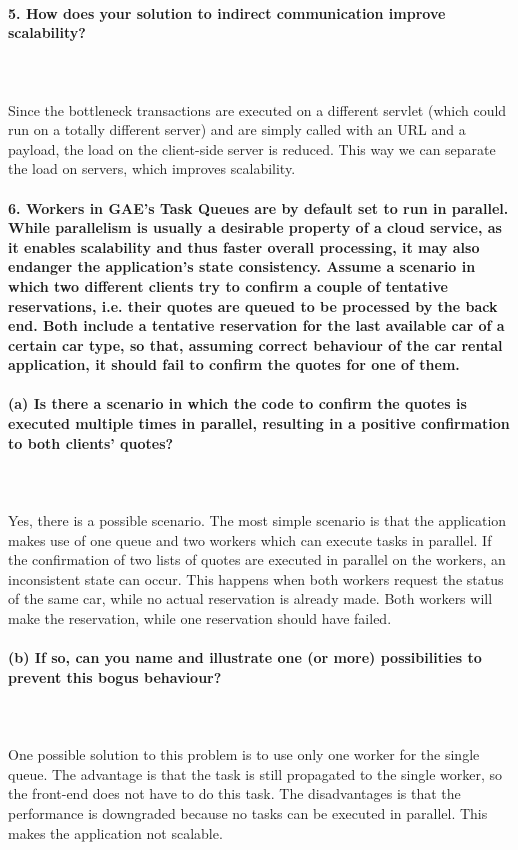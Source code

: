 \documentclass{ds-report}
\begin{document}
	\paragraph{5. How does your solution to indirect communication improve scalability?} \mbox{}\\\\
Since the bottleneck transactions are executed on a different servlet (which could run on a totally different server) and are simply called with an URL and a payload, the load on the client-side server is reduced. This way we can separate the load on servers, which improves scalability.

		\paragraph{6. Workers in GAE’s Task Queues are by default set to run in parallel. While parallelism is usually a desirable property of a cloud service, as it enables scalability and thus faster overall processing, it may also endanger the application’s state consistency. Assume a scenario in which two different clients try to confirm a couple of tentative reservations, i.e. their quotes are queued to be processed by the back end. Both include a tentative reservation for the last available car of a certain car type, so that, assuming correct behaviour of the car rental application, it should fail to confirm the quotes for one of them.} \mbox{}
\paragraph{(a) Is there a scenario in which the code to confirm the quotes is executed multiple times in parallel,
resulting in a positive confirmation to both clients’ quotes?}\mbox{}\\\\
Yes, there is a possible scenario. The most simple scenario is that the application makes use of one queue and two workers which can execute tasks in parallel. If the confirmation of two lists of quotes are executed in parallel on the workers, an inconsistent state can occur. This happens when both workers request the status of the same car, while no actual reservation is already made. Both workers will make the reservation, while one reservation should have failed.

\paragraph{(b) If so, can you name and illustrate one (or more) possibilities to prevent this bogus behaviour?}\mbox{}\\\\
One possible solution to this problem is to use only one worker for the single queue. The advantage is that the task is still propagated to the single worker, so the front-end does not have to do this task. The disadvantages is that the performance is downgraded because no tasks can be executed in parallel. This makes the application not scalable.
\clearpage
\end{document}
